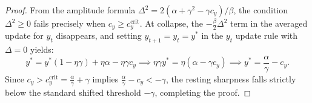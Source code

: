 \documentclass[10pt,a4paper]{amsart}
\begin{document}
\begin{proof}
From the amplitude formula $\Delta^2 = 2(\alpha + \gamma^2 - \gamma c_y)/\beta$, the condition $\Delta^2 \geq 0$ fails precisely when $c_y \geq c_y^{\mathrm{crit}}$. At collapse, the $-\frac{\beta}{2}\Delta^2$ term in the averaged update for $y_t$ disappears, and setting $y_{t+1} = y_t = y^*$ in the $y_t$ update rule with $\Delta = 0$ yields:
\[
    y^* = y^*(1-\eta\gamma) + \eta\alpha - \eta\gamma c_y
    \implies
    \eta\gamma y^* = \eta(\alpha - \gamma c_y)
    \implies
    y^* = \frac{\alpha}{\gamma} - c_y.
\]
Since $c_y > c_y^{\mathrm{crit}} = \frac{\alpha}{\gamma} + \gamma$ implies $\frac{\alpha}{\gamma} - c_y < -\gamma$, the resting sharpness falls strictly below the standard shifted threshold $-\gamma$, completing the proof.
\end{proof}
\end{document}
